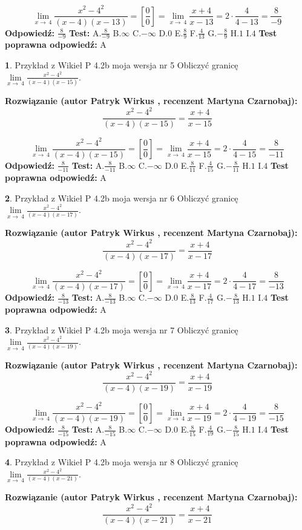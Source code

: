 \documentclass[12pt, a4paper]{article}
\theoremstyle{definition} %
\newtheorem{zad}{}
\newcommand{\zadStart}[1]{\begin{zad}#1\newline}
\newcommand{\zadStop}{\end{zad}}
\newcommand{\rozwStart}[2]{\noindent \textbf{Rozwiązanie (autor #1 , recenzent #2): }\newline}
\newcommand{\rozwStop}{\newline}
\newcommand{\odpStart}{\noindent \textbf{Odpowiedź:}\newline}
\newcommand{\odpStop}{\newline}
\newcommand{\testStart}{\noindent \textbf{Test:}\newline}
\newcommand{\testStop}{\newline}
\newcommand{\kluczStart}{\noindent \textbf{Test poprawna odpowiedź:}\newline}
\newcommand{\kluczStop}{\newline}
\begin{document}
$$\lim\limits_{x\to\ 4}\frac{x^{2}-4^{2}}{(x-4)(x-13)}=[\frac{0}{0}]=\lim\limits_{x\to\ 4}\frac{x+4}{x-13}=2 \cdot \frac{4}{4-13} = \frac{8}{-9}$$
\rozwStop
\odpStart
$\frac{8}{-9}$
\odpStop
\testStart
A.$\frac{8}{-9}$
B.$\infty$
C.$-\infty$
D.$0$
E.$\frac{8}{9}$
F.$\frac{4}{13}$
G.$-\frac{8}{9}$
H.$1$
I.$4$
\testStop
\kluczStart
A
\kluczStop



\zadStart{Przykład z Wikieł P 4.2b moja wersja nr 5}
Obliczyć granicę $\lim\limits_{x\to\ 4}\frac{x^{2}-4^{2}}{(x-4)(x-15)}$.
\zadStop
\rozwStart{Patryk Wirkus}{Martyna Czarnobaj}
$$\frac{x^{2}-4^{2}}{(x-4)(x-15)}=\frac{x+4}{x-15}$$

$$\lim\limits_{x\to\ 4}\frac{x^{2}-4^{2}}{(x-4)(x-15)}=[\frac{0}{0}]=\lim\limits_{x\to\ 4}\frac{x+4}{x-15}=2 \cdot \frac{4}{4-15} = \frac{8}{-11}$$
\rozwStop
\odpStart
$\frac{8}{-11}$
\odpStop
\testStart
A.$\frac{8}{-11}$
B.$\infty$
C.$-\infty$
D.$0$
E.$\frac{8}{11}$
F.$\frac{4}{15}$
G.$-\frac{8}{11}$
H.$1$
I.$4$
\testStop
\kluczStart
A
\kluczStop



\zadStart{Przykład z Wikieł P 4.2b moja wersja nr 6}
Obliczyć granicę $\lim\limits_{x\to\ 4}\frac{x^{2}-4^{2}}{(x-4)(x-17)}$.
\zadStop
\rozwStart{Patryk Wirkus}{Martyna Czarnobaj}
$$\frac{x^{2}-4^{2}}{(x-4)(x-17)}=\frac{x+4}{x-17}$$

$$\lim\limits_{x\to\ 4}\frac{x^{2}-4^{2}}{(x-4)(x-17)}=[\frac{0}{0}]=\lim\limits_{x\to\ 4}\frac{x+4}{x-17}=2 \cdot \frac{4}{4-17} = \frac{8}{-13}$$
\rozwStop
\odpStart
$\frac{8}{-13}$
\odpStop
\testStart
A.$\frac{8}{-13}$
B.$\infty$
C.$-\infty$
D.$0$
E.$\frac{8}{13}$
F.$\frac{4}{17}$
G.$-\frac{8}{13}$
H.$1$
I.$4$
\testStop
\kluczStart
A
\kluczStop



\zadStart{Przykład z Wikieł P 4.2b moja wersja nr 7}
Obliczyć granicę $\lim\limits_{x\to\ 4}\frac{x^{2}-4^{2}}{(x-4)(x-19)}$.
\zadStop
\rozwStart{Patryk Wirkus}{Martyna Czarnobaj}
$$\frac{x^{2}-4^{2}}{(x-4)(x-19)}=\frac{x+4}{x-19}$$

$$\lim\limits_{x\to\ 4}\frac{x^{2}-4^{2}}{(x-4)(x-19)}=[\frac{0}{0}]=\lim\limits_{x\to\ 4}\frac{x+4}{x-19}=2 \cdot \frac{4}{4-19} = \frac{8}{-15}$$
\rozwStop
\odpStart
$\frac{8}{-15}$
\odpStop
\testStart
A.$\frac{8}{-15}$
B.$\infty$
C.$-\infty$
D.$0$
E.$\frac{8}{15}$
F.$\frac{4}{19}$
G.$-\frac{8}{15}$
H.$1$
I.$4$
\testStop
\kluczStart
A
\kluczStop



\zadStart{Przykład z Wikieł P 4.2b moja wersja nr 8}
Obliczyć granicę $\lim\limits_{x\to\ 4}\frac{x^{2}-4^{2}}{(x-4)(x-21)}$.
\zadStop
\rozwStart{Patryk Wirkus}{Martyna Czarnobaj}
$$\frac{x^{2}-4^{2}}{(x-4)(x-21)}=\frac{x+4}{x-21}$$
\end{document}
